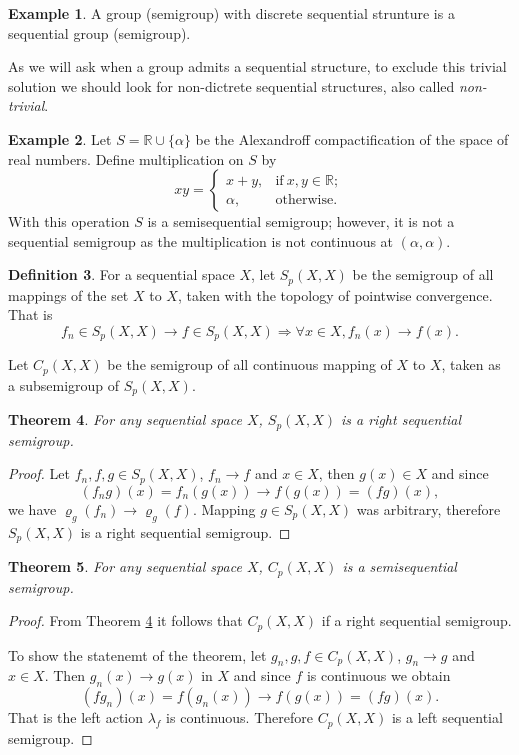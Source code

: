 \documentclass[12pt]{article}
\newtheorem{theorem}{Theorem}
\theoremstyle{definition}
\newtheorem{define}[theorem]{Definition}
\newtheorem{example}[theorem]{Example}
\theoremstyle{remark}
\begin{document}
\begin{example}
A group (semigroup) with discrete sequential strunture is a sequential group (semigroup).
\end{example}

As we will ask when a group admits a sequential structure, to exclude this trivial solution we should look for non-dictrete sequential structures, also called \emph{non-trivial}.

\begin{example}
Let $S=\mathbb{R}\cup\{\alpha\}$ be the Alexandroff compactification of the space of real numbers. Define multiplication on $S$ by
\[
    xy=\left\{ \begin{array}{ll}x+y, & \mathrm{if}\ x,y\in\mathbb{R}; \\ \alpha, & \mathrm{otherwise}. \end{array} \right.
\]
With this operation $S$ is a semisequential semigroup; however, it is not a sequential semigroup as the multiplication is not continuous at $(\alpha, \alpha)$.
\end{example}

\begin{define}\label{def:spxx}
For a sequential space $X$, let $S_p(X,X)$ be the semigroup of all mappings of the set $X$ to $X$, taken with the topology of pointwise convergence. That is
\[
    f_n\in S_p(X,X)\to f\in S_p(X,X) \Rightarrow \forall x\in X, f_n(x)\to f(x). 
\]

Let $C_p(X,X)$ be the semigroup of all continuous mapping of $X$ to $X$, taken as a subsemigroup of $S_p(X,X)$.
\end{define}

\begin{theorem}\label{th:rseqspxx}
For any sequential space $X$, $S_p(X,X)$ is a right sequential semigroup.
\end{theorem}
\begin{proof}
Let $f_n,f,g\in S_p(X,X)$, $f_n\to f$ and $x\in X$, then $g(x)\in X$ and since
\[
    (f_ng)(x)=f_n(g(x))\to f(g(x))=(fg)(x),
\]
we have $\varrho_g(f_n)\to\varrho_g(f)$. Mapping $g\in S_p(X,X)$ was arbitrary, therefore $S_p(X,X)$ is a right sequential semigroup.
\end{proof}

\begin{theorem}\label{th:sseqcpxx}
For any sequential space $X$, $C_p(X,X)$ is a semisequential semigroup.
\end{theorem}
\begin{proof}
From Theorem \ref{th:rseqspxx} it follows that $C_p(X,X)$ if a right sequential semigroup.

To show the statenemt of the theorem, let $g_n,g,f\in C_p(X,X)$, $g_n\to g$ and $x\in X$.
Then $g_n(x)\to g(x)$ in $X$ and since $f$ is continuous we obtain
\[
    (fg_n)(x)=f(g_n(x))\to f(g(x))=(fg)(x).
\]
That is the left action $\lambda_f$ is continuous. Therefore $C_p(X,X)$ is a left sequential semigroup.
\end{proof}
\end{document}
